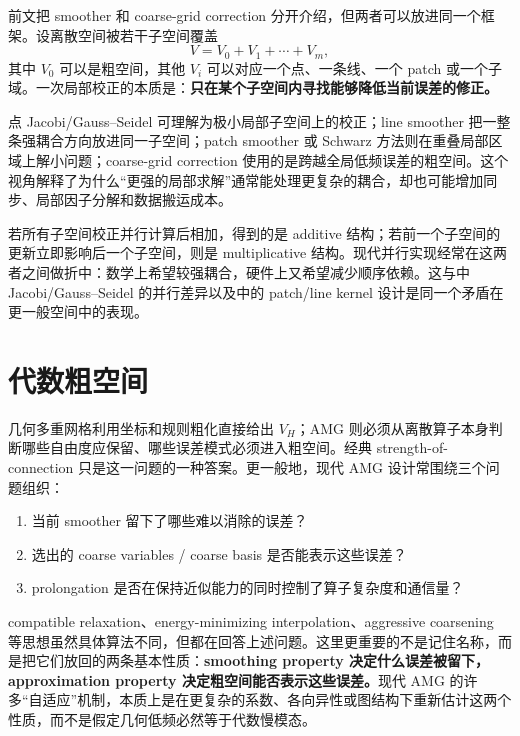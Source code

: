 前文把 smoother 和 coarse-grid correction 分开介绍，但两者可以放进同一个框架。设离散空间被若干子空间覆盖
\begin{equation}
V=V_0+V_1+\cdots+V_m,
\end{equation}
其中 $V_0$ 可以是粗空间，其他 $V_i$ 可以对应一个点、一条线、一个 patch 或一个子域。一次局部校正的本质是：\textbf{只在某个子空间内寻找能够降低当前误差的修正。}

点 Jacobi/Gauss--Seidel 可理解为极小局部子空间上的校正；line smoother 把一整条强耦合方向放进同一子空间；patch smoother 或 Schwarz 方法则在重叠局部区域上解小问题；coarse-grid correction 使用的是跨越全局低频误差的粗空间。这个视角解释了为什么“更强的局部求解”通常能处理更复杂的耦合，却也可能增加同步、局部因子分解和数据搬运成本。

若所有子空间校正并行计算后相加，得到的是 additive 结构；若前一个子空间的更新立即影响后一个子空间，则是 multiplicative 结构。现代并行实现经常在这两者之间做折中：数学上希望较强耦合，硬件上又希望减少顺序依赖。这与中 Jacobi/Gauss--Seidel 的并行差异以及中的 patch/line kernel 设计是同一个矛盾在更一般空间中的表现。

\section{代数粗空间}
\label{sec:modern-amg-coarse-space}

几何多重网格利用坐标和规则粗化直接给出 $V_H$；AMG 则必须从离散算子本身判断哪些自由度应保留、哪些误差模式必须进入粗空间。经典 strength-of-connection 只是这一问题的一种答案。更一般地，现代 AMG 设计常围绕三个问题组织：
\begin{enumerate}
\item 当前 smoother 留下了哪些难以消除的误差？
\item 选出的 coarse variables / coarse basis 是否能表示这些误差？
\item prolongation 是否在保持近似能力的同时控制了算子复杂度和通信量？
\end{enumerate}

compatible relaxation、energy-minimizing interpolation、aggressive coarsening 等思想虽然具体算法不同，但都在回答上述问题。这里更重要的不是记住名称，而是把它们放回的两条基本性质：\textbf{smoothing property 决定什么误差被留下，approximation property 决定粗空间能否表示这些误差。}现代 AMG 的许多“自适应”机制，本质上是在更复杂的系数、各向异性或图结构下重新估计这两个性质，而不是假定几何低频必然等于代数慢模态。

